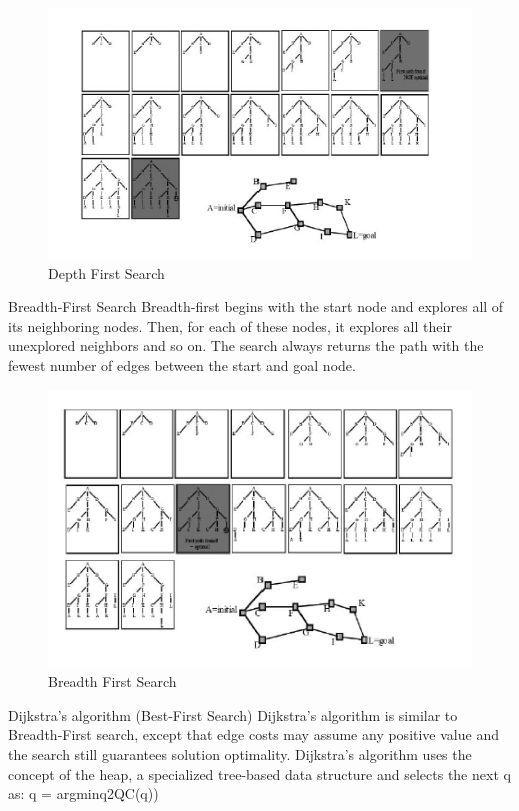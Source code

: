 \documentclass[twoside]{article}
\begin{document}
\begin{figure}[h!]
\begin{center}
\includegraphics{fig15_8.PNG}
\caption{Depth First Search}
\end{center}
\end{figure}

Breadth-First Search
Breadth-first begins with the start node and explores all of its neighboring nodes. Then, for each of these nodes, it explores all their unexplored neighbors and so on.
The search always returns the path with the fewest number of edges between the start and goal node.

\begin{figure}[h!]
\begin{center}
\includegraphics{fig15_9.PNG}
\caption{Breadth First Search}
\end{center}
\end{figure}

Dijkstra’s algorithm (Best-First Search)
Dijkstra’s algorithm is similar to Breadth-First search, except that edge costs may assume any positive value and the search still guarantees solution optimality. Dijkstra’s algorithm uses the concept of the heap, a specialized tree-based data structure and selects the next q as: q = argminq2QC(q))
\end{document}
